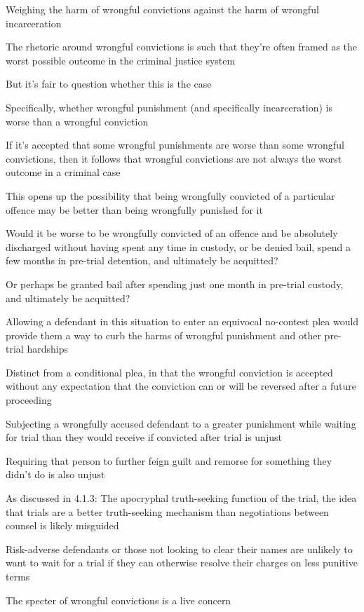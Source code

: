Weighing the harm of wrongful convictions against the harm of wrongful incarceration

The rhetoric around wrongful convictions is such that they're often framed as the worst possible outcome in the criminal justice system

But it's fair to question whether this is the case

Specifically, whether wrongful punishment (and specifically incarceration) is worse than a wrongful conviction

If it's accepted that some wrongful punishments are worse than some wrongful convictions, then it follows that wrongful convictions are not always the worst outcome in a criminal case

This opens up the possibility that being wrongfully convicted of a particular offence may be better than being wrongfully punished for it

Would it be worse to be wrongfully convicted of an offence and be absolutely discharged without having spent any time in custody, or be denied bail, spend a few months in pre-trial detention, and ultimately be acquitted?

Or perhaps be granted bail after spending just one month in pre-trial custody, and ultimately be acquitted?

Allowing a defendant in this situation to enter an equivocal no-contest plea would provide them a way to curb the harms of wrongful punishment and other pre-trial hardships

Distinct from a conditional plea, in that the wrongful conviction is accepted without any expectation that the conviction can or will be reversed after a future proceeding

Subjecting a wrongfully accused defendant to a greater punishment while waiting for trial than they would receive if convicted after trial is unjust

Requiring that person to further feign guilt and remorse for something they didn't do is also unjust

As discussed in 4.1.3: The apocryphal truth-seeking function of the trial, the idea that trials are a better truth-seeking mechanism than negotiations between counsel is likely misguided

Risk-adverse defendants or those not looking to clear their names are unlikely to want to wait for a trial if they can otherwise resolve their charges on less punitive terms

The specter of wrongful convictions is a live concern

